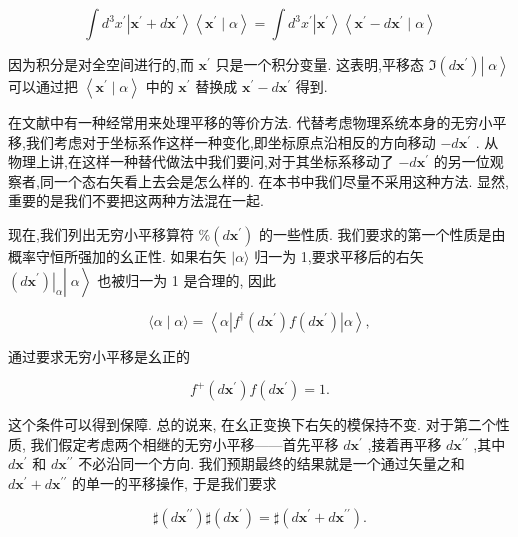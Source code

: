 \documentclass[lang=cn,newtx,10pt,scheme=chinese,thmcnt=section]{elegantbook}
\begin{document}
$$
\int {d}^{3}{x}^{\prime }\left| {{\mathbf{x}}^{\prime } + d{\mathbf{x}}^{\prime }}\right\rangle \left\langle {{\mathbf{x}}^{\prime } \mid \alpha }\right\rangle = \int {d}^{3}{x}^{\prime }\left| {\mathbf{x}}^{\prime }\right\rangle \left\langle {{\mathbf{x}}^{\prime } - d{\mathbf{x}}^{\prime } \mid \alpha }\right\rangle \tag{1.6.14}
$$

因为积分是对全空间进行的,而 ${\mathbf{x}}^{\prime }$ 只是一个积分变量. 这表明,平移态 $\left. {\left. {\Im \left( {d{\mathbf{x}}^{\prime }}\right) }\right| \;\alpha }\right\rangle$ 可以通过把 $\left\langle {{\mathbf{x}}^{\prime } \mid \alpha }\right\rangle$ 中的 ${\mathbf{x}}^{\prime }$ 替换成 ${\mathbf{x}}^{\prime } - d{\mathbf{x}}^{\prime }$ 得到.

在文献中有一种经常用来处理平移的等价方法. 代替考虑物理系统本身的无穷小平移,我们考虑对于坐标系作这样一种变化,即坐标原点沿相反的方向移动 $- d{\mathbf{x}}^{\prime }$ . 从物理上讲,在这样一种替代做法中我们要问,对于其坐标系移动了 $- d{\mathbf{x}}^{\prime }$ 的另一位观察者,同一个态右矢看上去会是怎么样的. 在本书中我们尽量不采用这种方法. 显然, 重要的是我们不要把这两种方法混在一起.

现在,我们列出无穷小平移算符 $\% \left( {d{\mathbf{x}}^{\prime }}\right)$ 的一些性质. 我们要求的第一个性质是由概率守恒所强加的幺正性. 如果右矢 $|\alpha \rangle$ 归一为 1,要求平移后的右矢 $\left. {\left. {\left. \left( d{\mathbf{x}}^{\prime }\right) \right| }_{\alpha }\right| \;\alpha }\right\rangle$ 也被归一为 1 是合理的, 因此

$$
\langle \alpha \mid \alpha \rangle = \left\langle {\alpha \left| {{f}^{ \dagger }\left( {d{\mathbf{x}}^{\prime }}\right) f\left( {d{\mathbf{x}}^{\prime }}\right) }\right| \alpha }\right\rangle , \tag{1.6.15}
$$

通过要求无穷小平移是幺正的

$$
{f}^{ + }\left( {d{\mathbf{x}}^{\prime }}\right) f\left( {d{\mathbf{x}}^{\prime }}\right) = 1. \tag{1.6.16}
$$

这个条件可以得到保障. 总的说来, 在幺正变换下右矢的模保持不变. 对于第二个性质, 我们假定考虑两个相继的无穷小平移——首先平移 $d{\mathbf{x}}^{\prime }$ ,接着再平移 $d{\mathbf{x}}^{\prime \prime }$ ,其中 $d{\mathbf{x}}^{\prime }$ 和 $d{\mathbf{x}}^{\prime \prime }$ 不必沿同一个方向. 我们预期最终的结果就是一个通过矢量之和 $d{\mathbf{x}}^{\prime } + d{\mathbf{x}}^{\prime \prime }$ 的单一的平移操作, 于是我们要求

$$
\sharp \left( {d{\mathbf{x}}^{\prime \prime }}\right) \sharp \left( {d{\mathbf{x}}^{\prime }}\right) = \sharp \left( {d{\mathbf{x}}^{\prime } + d{\mathbf{x}}^{\prime \prime }}\right) . \tag{1. 6.17}
$$
\end{document}
